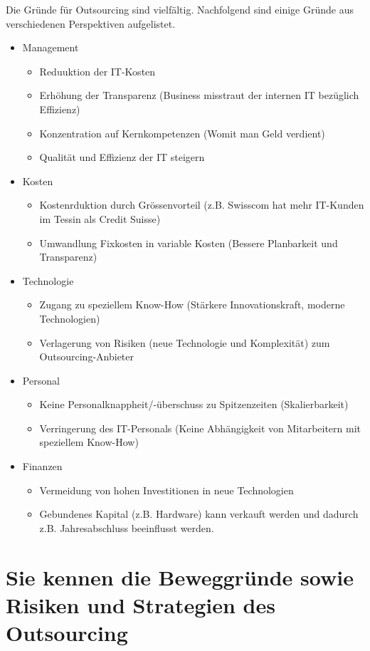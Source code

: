 Die Gründe für Outsourcing sind vielfältig. Nachfolgend sind einige Gründe aus verschiedenen Perspektiven aufgelistet.
\begin{itemize}
	\item Management
	\begin{itemize}
		\item Reduuktion der IT-Kosten
		\item Erhöhung der Transparenz (Business misstraut der internen IT bezüglich Effizienz)
		\item Konzentration auf Kernkompetenzen (Womit man Geld verdient)
		\item Qualität und Effizienz der IT steigern
	\end{itemize}
	\item Kosten
	\begin{itemize}
		\item Kostenrduktion durch Grössenvorteil (z.B. Swisscom hat mehr IT-Kunden im Tessin als Credit Suisse)
		\item Umwandlung Fixkosten in variable Kosten (Bessere Planbarkeit und Transparenz)
	\end{itemize}
	\item Technologie
	\begin{itemize}
		\item Zugang zu speziellem Know-How (Stärkere Innovationskraft, moderne Technologien)
		\item Verlagerung von Risiken (neue Technologie und Komplexität) zum Outsourcing-Anbieter
	\end{itemize}
	\item Personal
	\begin{itemize}
		\item Keine Personalknappheit/-überschuss zu Spitzenzeiten (Skalierbarkeit)
		\item Verringerung des IT-Personals (Keine Abhängigkeit von Mitarbeitern mit speziellem Know-How)
	\end{itemize}
	\item Finanzen
	\begin{itemize}
		\item Vermeidung von hohen Investitionen in neue Technologien
		\item Gebundenes Kapital (z.B. Hardware) kann verkauft werden und dadurch z.B. Jahresabschluss beeinflusst werden.
	\end{itemize}
\end{itemize}

\section{Sie kennen die Beweggründe sowie Risiken und Strategien des Outsourcing}

